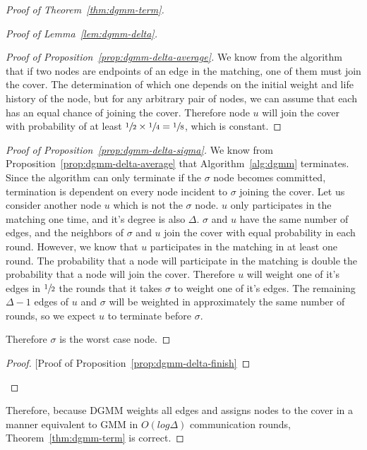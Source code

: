 \begin{proof}[Proof of Theorem~\ref{thm:dgmm-term}]
\begin{proof}[Proof of Lemma~\ref{lem:dgmm-delta}]
\begin{proof}[Proof of Proposition~\ref{prop:dgmm-delta-average}]
We know from the algorithm that if two nodes are endpoints of an edge in the matching, one of them must join the cover. The determination of which one depends on the initial weight and life history of the node, but for any arbitrary pair of nodes, we can assume that each has an equal chance of joining the cover. Therefore node $u$ will join the cover with probability of at least $\sfrac{1}{2} \times \sfrac{1}{4} = \sfrac{1}{8}$, which is constant.
\end{proof}
\begin{proof}[Proof of Proposition~\ref{prop:dgmm-delta-sigma}]
We know from Proposition~\ref{prop:dgmm-delta-average} that Algorithm~\ref{alg:dgmm} terminates. Since the algorithm can only terminate if the $\sigma$ node becomes committed, termination is dependent on every node incident to $\sigma$ joining the cover. Let us consider another node $u$ which is not the $\sigma$ node. $u$ only participates in the matching one time, and it's degree is also $\Delta$. $\sigma$ and $u$ have the same number of edges, and the neighbors of $\sigma$ and $u$ join the cover with equal probability in each round. However, we know that $u$ participates in the matching in at least one round. The probability that a node will participate in the matching is double the probability that a node will join the cover. Therefore $u$ will weight one of it's edges in $\sfrac{1}{2}$ the rounds that it takes $\sigma$ to weight one of it's edges. The remaining $\Delta - 1$ edges of $u$ and $\sigma$ will be weighted in approximately the same number of rounds, so we expect $u$ to terminate before $\sigma$. 

Therefore $\sigma$ is the worst case node. 
\end{proof}
\begin{proof}[Proof of Proposition~\ref{prop:dgmm-delta-finish}

\end{proof}
\end{proof}
Therefore, because DGMM weights all edges and assigns nodes to the cover in a manner equivalent to GMM in $O(log \Delta)$ communication rounds, Theorem~\ref{thm:dgmm-term} is correct.
\end{proof}
